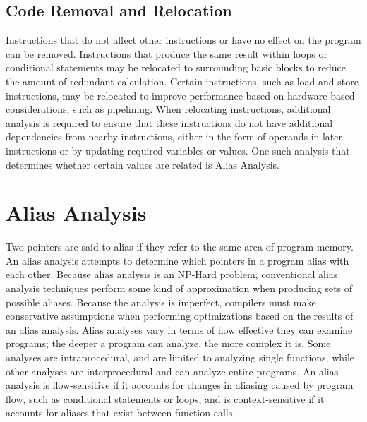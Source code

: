 \subsection{Code Removal and Relocation}
Instructions that do not affect other instructions or have no effect on the program can be removed. Instructions that produce the same result within loops or conditional statements may be relocated to surrounding basic blocks to reduce the amount of redundant calculation. Certain instructions, such as load and store instructions, may be relocated to improve performance based on hardware-based considerations, such as pipelining. When relocating instructions, additional analysis is required to ensure that these instructions do not have additional dependencies from nearby instructions, either in the form of operands in later instructions or by updating required variables or values. One such analysis that determines whether certain values are related is Alias Analysis.

\section{Alias Analysis}
Two pointers are said to alias if they refer to the same area of program memory. An alias analysis attempts to determine which pointers in a program alias with each other. Because alias analysis is an NP-Hard problem, conventional alias analysis techniques perform some kind of approximation when producing sets of possible aliases. Because the analysis is imperfect, compilers must make conservative assumptions when performing optimizations based on the results of an alias analysis. Alias analyses vary in terms of how effective they can examine programs; the deeper a program can analyze, the more complex it is. Some analyses are intraprocedural, and are limited to analyzing single functions, while other analyses are interprocedural and can analyze entire programs. An alias analysis is flow-sensitive if it accounts for changes in aliasing caused by program flow, such as conditional statements or loops, and is context-sensitive if it accounts for aliases that exist between function calls.
